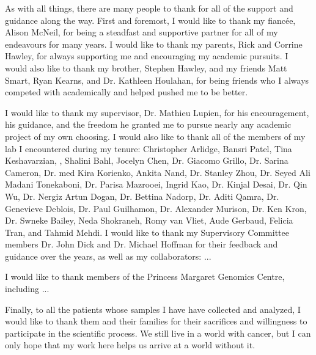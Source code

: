 \begin{acknowledgements}

  As with all things, there are many people to thank for all of the support and guidance along the way.
  First and foremost, I would like to thank my fianc\'ee, Alison McNeil, for being a steadfast and supportive partner for all of my endeavours for many years.
  I would like to thank my parents, Rick and Corrine Hawley, for always supporting me and encouraging my academic pursuits.
  I would also like to thank my brother, Stephen Hawley, and my friends Matt Smart, Ryan Kearns, and Dr. Kathleen Houlahan, for being friends who I always competed with academically and helped pushed me to be better.

  I would like to thank my supervisor, Dr. Mathieu Lupien, for his encouragement, his guidance, and the freedom he granted me to pursue nearly any academic project of my own choosing.
  I would also like to thank all of the members of my lab I encountered during my tenure: Christopher Arlidge, Bansri Patel, Tina Keshavarzian, , Shalini Bahl, Jocelyn Chen, Dr. Giacomo Grillo, Dr. Sarina Cameron, Dr. med Kira Korienko, Ankita Nand, Dr. Stanley Zhou, Dr. Seyed Ali Madani Tonekaboni, Dr. Parisa Mazrooei, Ingrid Kao, Dr. Kinjal Desai, Dr. Qin Wu, Dr. Nergiz Artun Dogan, Dr. Bettina Nadorp, Dr. Aditi Qamra, Dr. Genevieve Deblois, Dr. Paul Guilhamon, Dr. Alexander Murison, Dr. Ken Kron, Dr. Swneke Bailey, Neda Shokraneh, Romy van Vliet, Aude Gerbaud, Felicia Tran, and Tahmid Mehdi.
  I would like to thank my Supervisory Committee members Dr. John Dick and Dr. Michael Hoffman for their feedback and guidance over the years, as well as my collaborators: ...

  I would like to thank members of the Princess Margaret Genomics Centre, including ...

  Finally, to all the patients whose samples I have have collected and analyzed, I would like to thank them and their families for their sacrifices and willingness to participate in the scientific process.
  We still live in a world with cancer, but I can only hope that my work here helps us arrive at a world without it.
\end{acknowledgements}